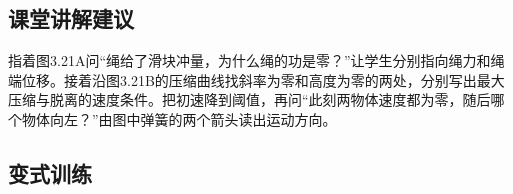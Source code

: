 \documentclass[UTF8,fontset=fandol,a4paper,11pt]{ctexart}
\begin{document}


\subsection*{课堂讲解建议}

指着图3.21A问“绳给了滑块冲量，为什么绳的功是零？”让学生分别指向绳力和绳端位移。接着沿图3.21B的压缩曲线找斜率为零和高度为零的两处，分别写出最大压缩与脱离的速度条件。把初速降到阈值，再问“此刻两物体速度都为零，随后哪个物体向左？”由图中弹簧的两个箭头读出运动方向。



\subsection*{变式训练}
\end{document}
